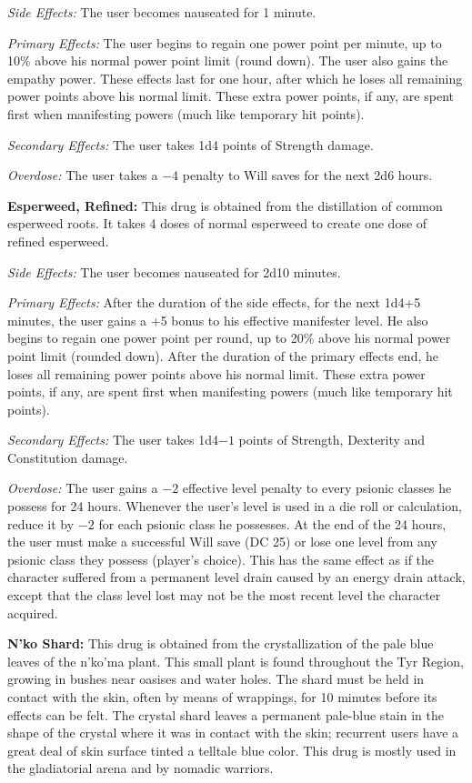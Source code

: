 \textit{Side Effects:} The user becomes nauseated for 1 minute.

\textit{Primary Effects:} The user begins to regain one power point per minute, up to 10\% above his normal power point limit (round down). The user also gains the empathy power. These effects last for one hour, after which he loses all remaining power points above his normal limit. These extra power points, if any, are spent first when manifesting powers (much like temporary hit points).

\textit{Secondary Effects:} The user takes 1d4 points of Strength damage.

\textit{Overdose:} The user takes a $-4$ penalty to Will saves for the next 2d6 hours.

\textbf{Esperweed, Refined:} This drug is obtained from the distillation of common esperweed roots. It takes 4 doses of normal esperweed to create one dose of refined esperweed.

\textit{Side Effects:} The user becomes nauseated for 2d10 minutes.

\textit{Primary Effects:} After the duration of the side effects, for the next 1d4+5 minutes, the user gains a +5 bonus to his effective manifester level. He also begins to regain one power point per round, up to 20\% above his normal power point limit (rounded down). After the duration of the primary effects end, he loses all remaining power points above his normal limit. These extra power points, if any, are spent first when manifesting powers (much like temporary hit points).

\textit{Secondary Effects:} The user takes 1d4$-1$ points of Strength, Dexterity and Constitution damage.

\textit{Overdose:} The user gains a $-2$ effective level penalty to every psionic classes he possess for 24 hours. Whenever the user's level is used in a die roll or calculation, reduce it by $-2$ for each psionic class he possesses. At the end of the 24 hours, the user must make a successful Will save (DC 25) or lose one level from any psionic class they possess (player's choice). This has the same effect as if the character suffered from a permanent level drain caused by an energy drain attack, except that the class level lost may not be the most recent level the character acquired.

\textbf{N'ko Shard:} This drug is obtained from the crystallization of the pale blue leaves of the n'ko'ma plant. This small plant is found throughout the Tyr Region, growing in bushes near oasises and water holes. The shard must be held in contact with the skin, often by means of wrappings, for 10 minutes before its effects can be felt. The crystal shard leaves a permanent pale-blue stain in the shape of the crystal where it was in contact with the skin; recurrent users have a great deal of skin surface tinted a telltale blue color. This drug is mostly used in the gladiatorial arena and by nomadic warriors.

